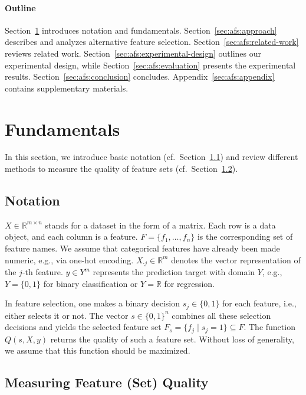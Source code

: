 \documentclass{article}
\theoremstyle{definition}
\begin{document}
\paragraph{Outline}

Section~\ref{sec:afs:fundamentals} introduces notation and fundamentals.
Section~\ref{sec:afs:approach} describes and analyzes alternative feature selection.
Section~\ref{sec:afs:related-work} reviews related work.
Section~\ref{sec:afs:experimental-design} outlines our experimental design, while Section~\ref{sec:afs:evaluation} presents the experimental results.
Section~\ref{sec:afs:conclusion} concludes.
Appendix~\ref{sec:afs:appendix} contains supplementary materials.

\section{Fundamentals}
\label{sec:afs:fundamentals}

In this section, we introduce basic notation (cf.~Section~\ref{sec:afs:fundamentals:notation}) and review different methods to measure the quality of feature sets (cf.~Section~\ref{sec:afs:fundamentals:quality}).

\subsection{Notation}
\label{sec:afs:fundamentals:notation}

$X \in \mathbb{R}^{m \times n}$ stands for a dataset in the form of a matrix.
Each row is a data object, and each column is a feature.
$F = \{f_1, \dots, f_n\}$ is the corresponding set of feature names.
We assume that categorical features have already been made numeric, e.g., via one-hot encoding.
$X_{\cdot{}j} \in \mathbb{R}^m$ denotes the vector representation of the $j$-th feature.
$y \in Y^m$ represents the prediction target with domain $Y$, e.g., $Y=\{0,1\}$ for binary classification or $Y=\mathbb{R}$ for regression.

In feature selection, one makes a binary decision $s_j \in \{0,1\}$ for each feature, i.e., either selects it or not.
The vector $s \in \{0,1\}^n$ combines all these selection decisions and yields the selected feature set $F_s = \{f_j \mid s_j=1\} \subseteq F$.
The function $Q(s,X,y)$ returns the quality of such a feature set.
Without loss of generality, we assume that this function should be maximized.

\subsection{Measuring Feature (Set) Quality}
\label{sec:afs:fundamentals:quality}
\end{document}
